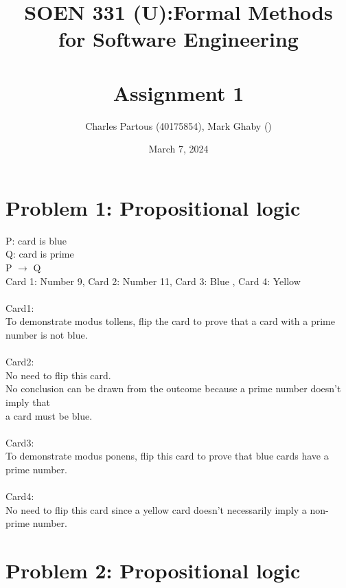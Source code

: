 \documentclass[12pt]{article}
\title{SOEN 331 (U):Formal Methods\\for Software Engineering\\
\ \\
Assignment 1}
\author{Charles Partous (40175854), Mark Ghaby ()}
\date{March 7, 2024}
\begin{document}
\maketitle



\newpage
\section*{Problem 1: Propositional logic}

\begin{tabbing}
P: card is blue \\
Q: card is prime \\
P $\rightarrow$ Q \\

Card 1: Number 9, Card 2: Number 11, Card 3: Blue , Card 4: Yellow\\\\

Card1:\\ To demonstrate modus tollens, flip the card to  prove that a card with a prime number is not blue.\\\\

Card2: \\No need to flip this card. \\No conclusion can be drawn from the outcome because a prime number doesn’t imply that\\ a card must be blue.\\\\

Card3: \\To demonstrate modus ponens, flip this card to prove that blue cards have a prime number.\\\\

Card4: \\No need to flip this card since a yellow card doesn’t necessarily imply a non-prime number.
\end{tabbing}

\newpage
\section*{Problem 2: Propositional logic}
\end{document}
